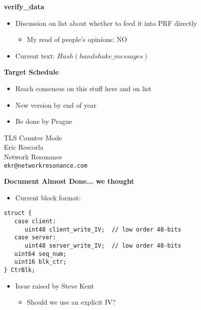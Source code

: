 \documentclass[fancybox]{seminar}
\newcommand{\heading}[1]{%
  \begin{center}
    \large\bf
    #1
  \end{center}
  \vspace{.4 in}}
\begin{document}
\begin{slide}
\heading{verify\_data}

\begin{itemize}
\item Discussion on list about whether to feed it into PRF directly
\begin{itemize}
\item My read of people's opinions: NO
\end{itemize}
\item Current text: $Hash(handshake\_messages)$
\end{itemize}
\end{slide}


\begin{slide}
\heading{Target Schedule}

\begin{itemize}
\item Reach consensus on this stuff here and on list
\item New version by end of year
\item Be done by Prague
\end{itemize}
\end{slide}


\begin{slide}
\begin{center}
\LARGE{{\bf}TLS Counter Mode}\\

\vspace{.3 in}
\large{Eric Rescorla}\\
\large{Network Resonance}\\
\large{\texttt{ekr@networkresonance.com}}

\end{center}
\end{slide}


\begin{slide}
\heading{Document Almost Done... we thought}

\begin{itemize}
\item Current block format:
\end{itemize}

{\small
\begin{verbatim}
struct {
   case client:
      uint48 client_write_IV;  // low order 48-bits
   case server:
      uint48 server_write_IV;  // low order 48-bits
   uint64 seq_num;
   uint16 blk_ctr;
} CtrBlk;
\end{verbatim}
}

\begin{itemize}
\item Issue raised by Steve Kent
\begin{itemize}
\item Should we use an explicit IV?
\end{itemize}
\end{itemize}

\end{slide}
\end{document}

